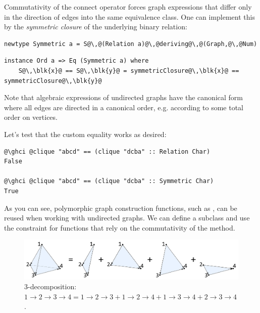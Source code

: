 Commutativity of the connect operator forces graph expressions that differ only
in the direction of edges into the same equivalence class. One can implement
this by the \emph{symmetric closure} of the underlying binary relation:

\begin{verbatim}
newtype Symmetric a = S@\,@(Relation a)@\,@deriving@\,@(Graph,@\,@Num)
\end{verbatim}
\vspace{1mm}
\begin{verbatim}
instance Ord a => Eq (Symmetric a) where
    S@\,\blk{x}@ == S@\,\blk{y}@ = symmetricClosure@\,\blk{x}@ == symmetricClosure@\,\blk{y}@
\end{verbatim}

Note that algebraic expressions of undirected graphs have the canonical form where all
edges are directed in a canonical order, e.g. according to some total order on vertices.

Let's test that the custom equality works as desired:

\begin{verbatim}
@\ghci @clique "abcd" == (clique "dcba" :: Relation Char)
False

@\ghci @clique "abcd" == (clique "dcba" :: Symmetric Char)
True
\end{verbatim}

As you can see, polymorphic graph construction functions, such as ,
can be reused when working with undirected graphs. We can define a subclass
 and use the
constraint for functions that rely on the commutativity of the  method.

\begin{figure}
\centerline{\includegraphics[scale=0.12]{fig/3-decomposition.pdf}}
\caption{3-decomposition:
    $1 \rightarrow 2 \rightarrow 3 \rightarrow 4 =
    1 \rightarrow 2 \rightarrow 3 + 1 \rightarrow 2 \rightarrow 4 +
    1 \rightarrow 3 \rightarrow 4 + 2 \rightarrow 3 \rightarrow 4$.
    \label{fig-3-decomposition}}
\end{figure}

